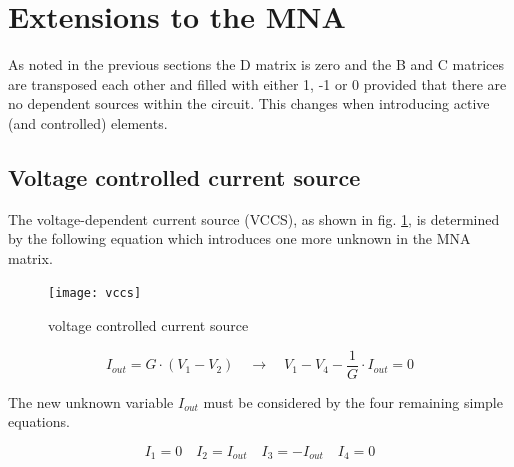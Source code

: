 \section{Extensions to the MNA}
\label{sec:MNAext}

As noted in the previous sections the D matrix is zero and the B and C
matrices are transposed each other and filled with either 1, -1 or 0
provided that there are no dependent sources within the circuit.  This
changes when introducing active (and controlled) elements.

\subsection{Voltage controlled current source}
\label{sec:vccs}

The voltage-dependent current source (VCCS), as shown in fig.
\ref{fig:vccs}, is determined by the following equation which
introduces one more unknown in the MNA matrix.

\begin{figure}[ht]
\begin{center}
\texttt{[image: vccs]}
\end{center}
\caption{voltage controlled current source}
\label{fig:vccs}
\end{figure}
\FloatBarrier

\begin{equation}
I_{out} = G\cdot\left(V_{1} - V_{2}\right)
\quad \rightarrow \quad
V_{1} - V_{4} - \frac{1}{G}\cdot I_{out} = 0
\label{eq:vccs}
\end{equation}

The new unknown variable $I_{out}$ must be considered by the four
remaining simple equations.

\begin{equation}
I_{1} = 0 \quad I_{2} = I_{out} \quad I_{3} = -I_{out} \quad I_{4} = 0
\end{equation}

